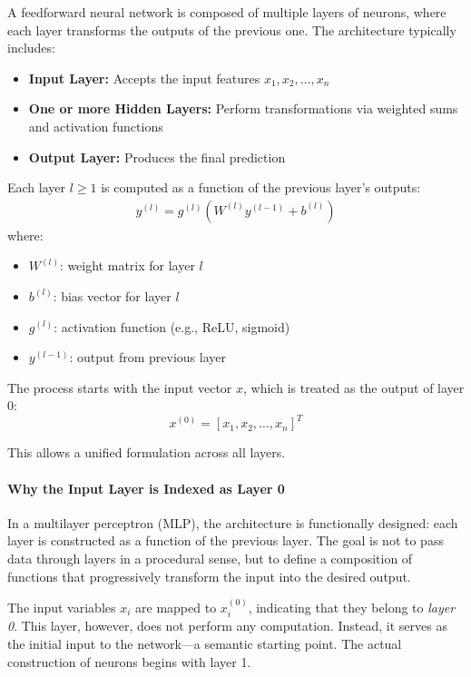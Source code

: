 A feedforward neural network is composed of multiple layers of neurons, where each layer transforms the outputs of the previous one. The architecture typically includes:

\begin{itemize}
    \item \textbf{Input Layer:} Accepts the input features \( x_1, x_2, \ldots, x_n \)
    \item \textbf{One or more Hidden Layers:} Perform transformations via weighted sums and activation functions
    \item \textbf{Output Layer:} Produces the final prediction
\end{itemize}

Each layer \( l \geq 1 \) is computed as a function of the previous layer's outputs:
\begin{align}
	y^{(l)} = g^{(l)}\left(W^{(l)} y^{(l-1)} + b^{(l)}\right)	
\end{align}
where:
\begin{itemize}
    \item \( W^{(l)} \): weight matrix for layer \( l \)
    \item \( b^{(l)} \): bias vector for layer \( l \)
    \item \( g^{(l)} \): activation function (e.g., ReLU, sigmoid)
    \item \( y^{(l-1)} \): output from previous layer
\end{itemize}

The process starts with the input vector \( x \), which is treated as the output of layer 0:
\[
x^{(0)} = [x_1, x_2, \ldots, x_n]^T
\]

This allows a unified formulation across all layers.

\paragraph*{Why the Input Layer is Indexed as Layer 0}

In a multilayer perceptron (MLP), the architecture is functionally designed: each layer is constructed as a function of the previous layer. The goal is not to pass data through layers in a procedural sense, but to define a composition of functions that progressively transform the input into the desired output.

\medskip

The input variables \( x_i \) are mapped to \( x_i^{(0)} \), indicating that they belong to \emph{layer 0}. This layer, however, does not perform any computation. Instead, it serves as the initial input to the network---a semantic starting point. The actual construction of neurons begins with layer 1.

